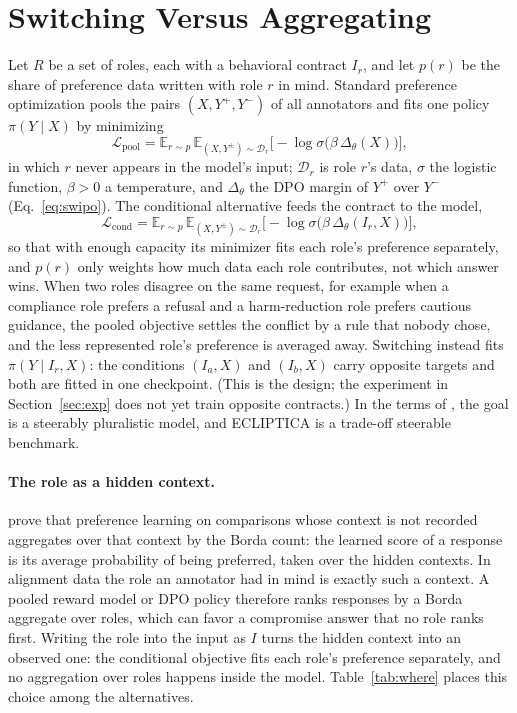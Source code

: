 \documentclass[letterpaper]{article} %
\begin{document}
\section{Switching Versus Aggregating}
\label{sec:socialchoice}

Let $R$ be a set of roles, each with a behavioral contract $I_r$, and let $p(r)$ be the share of preference data written with role $r$ in mind. Standard preference optimization pools the pairs $(X, Y^+, Y^-)$ of all annotators and fits one policy $\pi(Y\mid X)$ by minimizing
\begin{equation}
\label{eq:pool}
\mathcal{L}_{\mathrm{pool}} = \mathbb{E}_{r\sim p}\,\mathbb{E}_{(X,Y^{\pm})\sim\mathcal{D}_r}\big[-\log\sigma\big(\beta\,\Delta_\theta(X)\big)\big],
\end{equation}
in which $r$ never appears in the model's input; $\mathcal{D}_r$ is role $r$'s data, $\sigma$ the logistic function, $\beta>0$ a temperature, and $\Delta_\theta$ the DPO margin of $Y^+$ over $Y^-$ (Eq.~\ref{eq:swipo}). The conditional alternative feeds the contract to the model,
\begin{equation}
\label{eq:cond}
\mathcal{L}_{\mathrm{cond}} = \mathbb{E}_{r\sim p}\,\mathbb{E}_{(X,Y^{\pm})\sim\mathcal{D}_r}\big[-\log\sigma\big(\beta\,\Delta_\theta(I_r, X)\big)\big],
\end{equation}
so that with enough capacity its minimizer fits each role's preference separately, and $p(r)$ only weights how much data each role contributes, not which answer wins. When two roles disagree on the same request, for example when a compliance role prefers a refusal and a harm-reduction role prefers cautious guidance, the pooled objective settles the conflict by a rule that nobody chose, and the less represented role's preference is averaged away. Switching instead fits $\pi(Y\mid I_r, X)$: the conditions $(I_a, X)$ and $(I_b, X)$ carry opposite targets and both are fitted in one checkpoint. (This is the design; the experiment in Section~\ref{sec:exp} does not yet train opposite contracts.) In the terms of \citet{sorensen2024roadmap}, the goal is a steerably pluralistic model, and ECLIPTICA is a trade-off steerable benchmark.

\paragraph{The role as a hidden context.}
\citet{siththaranjan2024distributional} prove that preference learning on comparisons whose context is not recorded aggregates over that context by the Borda count: the learned score of a response is its average probability of being preferred, taken over the hidden contexts. In alignment data the role an annotator had in mind is exactly such a context. A pooled reward model or DPO policy therefore ranks responses by a Borda aggregate over roles, which can favor a compromise answer that no role ranks first. Writing the role into the input as $I$ turns the hidden context into an observed one: the conditional objective fits each role's preference separately, and no aggregation over roles happens inside the model. Table~\ref{tab:where} places this choice among the alternatives.
\end{document}
